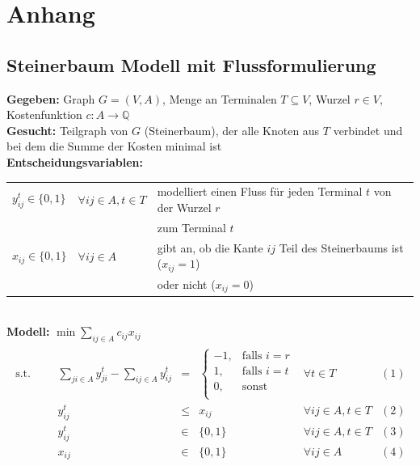 \documentclass[11pt,a4paper]{article}
\newcommand{\Q}{\mathbb{Q}}
\theoremstyle{my_th_style1}
\begin{document}
\clearpage
\section*{Anhang}
\subsection*{Steinerbaum Modell mit Flussformulierung}
\textbf{Gegeben:} Graph $G=(V,A)$, Menge an Terminalen $T \subseteq V $, Wurzel $r \in V$, Kostenfunktion $c:A \rightarrow \Q$\\
\textbf{Gesucht:} Teilgraph von $G$ (Steinerbaum), der alle Knoten aus $T$ verbindet und bei dem die Summe der Kosten minimal ist\\
\textbf{Entscheidungsvariablen:}\\
\begin{tabular}{lll}
	$y_{ij}^t \in \{0,1\}$ &$\forall ij \in A, t\in T $ & modelliert einen Fluss für jeden Terminal $t$ von der Wurzel $r$\\
	&& zum Terminal $t$\\
	$x_{ij} \in \{0,1\}$ & $\forall ij \in A$ &gibt an, ob die Kante $ij$ Teil des Steinerbaums ist ($x_{ij}=1$)\\
	&& oder nicht ($x_{ij}=0$)\\
\end{tabular}\\
\textbf{Modell:}
$\min \displaystyle\sum_{ij \in A} c_{ij} x_{ij} $
\begin{align}
\begin{array}{rcrcrcll}
\textrm{s.t.}  
&& &\displaystyle\sum_{ji \in A} y_{ji}^t - \displaystyle\sum_{ij \in A} y_{ij}^t& = & \left\{\begin{array}{rl} 
-1, & \text{falls } i=r\\ 
1, & \text{falls } i=t\\ 
0, & \text{sonst}\\ 
\end{array}
\right. & \forall t \in T & (1) \\
  &&& y_{ij}^t & \leq & x_{ij} & \forall ij \in A, t\in T & (2)\\
&&& y_{ij}^t & \in & \{0,1 \}& \forall ij \in A , t \in T& (3)\\
&&& x_{ij} & \in & \{0,1\}& \forall ij \in A & (4)\\
\end{array}
\label{SteinerbaumModel}
\end{align}
\end{document}
